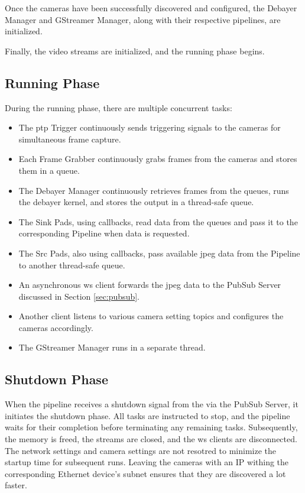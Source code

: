 Once the cameras have been successfully discovered and configured, the Debayer Manager and GStreamer Manager, along with their respective pipelines, are initialized.

Finally, the video streams are initialized, and the running phase begins.

\subsection{Running Phase}
During the running phase, there are multiple concurrent tasks:

\begin{itemize}
    \item The \gls{ptp} Trigger continuously sends triggering signals to the cameras for simultaneous frame capture.
    \item Each Frame Grabber continuously grabs frames from the cameras and stores them in a queue.
    \item The Debayer Manager continuously retrieves frames from the queues, runs the debayer kernel, and stores the output in a thread-safe queue.
    \item The Sink Pads, using callbacks, read data from the queues and pass it to the corresponding Pipeline when data is requested.
    \item The Src Pads, also using callbacks, pass available \gls{jpeg} data from the Pipeline to another thread-safe queue.
    \item An asynchronous \gls{ws} client forwards the \gls{jpeg} data to the PubSub Server discussed in Section \ref{sec:pubsub}.
    \item Another client listens to various camera setting topics and configures the cameras accordingly.
    \item The GStreamer Manager runs in a separate thread.
\end{itemize}



\subsection{Shutdown Phase}

When the pipeline receives a shutdown signal from the \srgui via the PubSub Server, it initiates the shutdown phase.
All tasks are instructed to stop, and the pipeline waits for their completion before terminating any remaining tasks.
Subsequently, the memory is freed, the streams are closed, and the \gls{ws} clients are disconnected.
The network settings and camera settings are not resotred to minimize the startup time for subsequent runs.
Leaving the cameras with an IP withing the corresponding Ethernet device's subnet ensures that they are discovered a lot faster.


